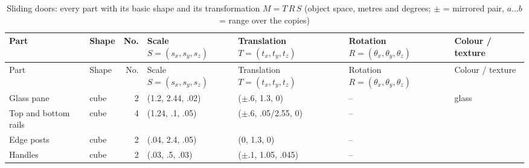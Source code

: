 {\scriptsize\setlength{\tabcolsep}{3pt}
\begin{longtable}{@{}P{2.6cm} P{1.65cm} r P{2.85cm} P{3.3cm} P{2.05cm} P{1.75cm}@{}}
\caption{Sliding doors: every part with its basic shape and its transformation $M = T\,R\,S$ (object space, metres and degrees; $\pm$ = mirrored pair, $a\ldots b$ = range over the copies)}\\
\toprule
Part & Shape & No. & Scale $S=(s_x,s_y,s_z)$ & Translation $T=(t_x,t_y,t_z)$ & Rotation $R=(\theta_x,\theta_y,\theta_z)$ & Colour / texture \\
\midrule
\endfirsthead
\toprule
Part & Shape & No. & Scale $S=(s_x,s_y,s_z)$ & Translation $T=(t_x,t_y,t_z)$ & Rotation $R=(\theta_x,\theta_y,\theta_z)$ & Colour / texture \\
\midrule
\endhead
\bottomrule
\endfoot
Glass pane & cube & 2 & (1.2, 2.44, .02) & ($\pm$.6, 1.3, 0) & -- &  glass \\
Top and bottom rails & cube & 4 & (1.24, .1, .05) & ($\pm$.6, .05/2.55, 0) & -- &   \\
Edge posts & cube & 2 & (.04, 2.4, .05) & (0, 1.3, 0) & -- &   \\
Handles & cube & 2 & (.03, .5, .03) & ($\pm$.1, 1.05, .045) & -- &  \\
\end{longtable}}
